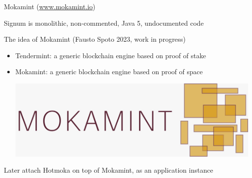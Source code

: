 \documentclass[11pt]{beamer}  %
\begin{document}
\begin{frame}{Mokamint (\url{www.mokamint.io})}

  Signum is monolithic, non-commented, Java 5, undocumented code

  \bigskip
  \bigskip

  \begin{greenbox}{The idea of Mokamint (Fausto Spoto 2023, work in progress)}
    \begin{itemize}
    \item Tendermint: a generic blockchain engine based on proof of stake
    \item Mokamint: a generic blockchain engine based on proof of space
      \begin{center}
        \includegraphics[scale=0.1,clip=false]{pictures/mokamint_colors.jpg}
      \end{center}
    \end{itemize}
  \end{greenbox}

  \bigskip

  Later attach Hotmoka on top of Mokamint, as an application instance

\end{frame}
\end{document}
